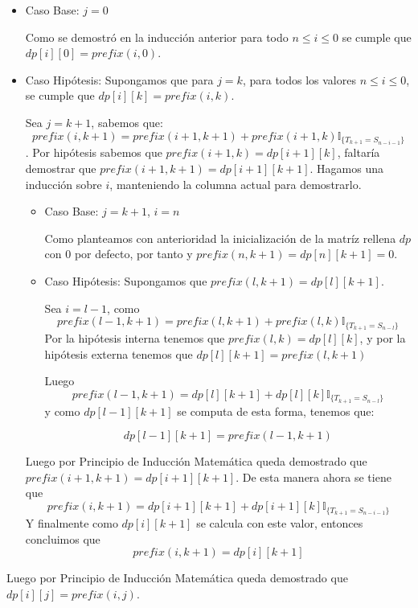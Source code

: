 \documentclass[a4paper]{article}
\begin{document}
\begin{itemize}
    \item Caso Base: $j = 0$ 
    
    Como se demostr\'o en la inducción anterior para todo $n \leq i \leq 0$ se cumple que $dp[i][0] = prefix(i,0)$. 

    \item Caso Hip\'otesis: Supongamos que para $j = k$, para todos los valores $n \leq i \leq 0$, se cumple que $dp[i][k] = prefix(i,k)$.
    
    Sea $j = k+1$, sabemos que: $$prefix(i,k+1) = prefix(i+1,k+1) + prefix(i+1,k)\mathbb{I}_{\{ T_{k+1} = S_{n-i-1}\}}$$. Por hip\'otesis 
    sabemos que $prefix(i+1,k) = dp[i+1][k]$, faltar\'ia demostrar que $prefix(i+1,k+1) = dp[i+1][k+1]$. Hagamos una inducci\'on sobre $i$, manteniendo la columna actual 
    para demostrarlo. 

    \begin{itemize}
        \item Caso Base: $j = k+1$, $i = n$
        
        Como planteamos con anterioridad la inicializaci\'on de la matr\'iz rellena $dp$ con $0$ por defecto, por tanto  
        y  $prefix(n,k+1)=dp[n][k+1] = 0$. 

        \item Caso Hip\'otesis: Supongamos que $prefix(l,k+1) = dp[l][k+1]$. 
        
        Sea $i = l-1$, como $$prefix(l-1,k+1) = prefix(l,k+1) + prefix(l,k)\mathbb{I}_{\{ T_{k+1} = S_{n-l}\}}$$
        Por la hip\'otesis interna tenemos que $prefix(l,k) = dp[l][k]$,
        y por la hip\'otesis externa tenemos que $dp[l][k+1] = prefix(l,k+1)$

        Luego $$prefix(l-1,k+1) = dp[l][k+1] + dp[l][k]\mathbb{I}_{\{ T_{k+1} = S_{n-l}\}}$$
        y como $dp[l-1][k+1]$ se computa de esta forma, tenemos que:

        $$dp[l-1][k+1] = prefix(l-1,k+1)$$
    \end{itemize}

    Luego por Principio de Inducción Matemática queda demostrado que $prefix(i+1,k+1) = dp[i+1][k+1]$.
    De esta manera ahora se tiene que
    $$prefix(i,k+1) = dp[i+1][k+1] + dp[i+1][k]\mathbb{I}_{\{ T_{k+1} = S_{n-i-1}\}}$$
    Y finalmente como $dp[i][k+1]$ se calcula con este valor, entonces concluimos que
    $$prefix(i,k+1) = dp[i][k+1]$$
\end{itemize}
    Luego por Principio de Inducción Matem\'atica queda demostrado que $dp[i][j] = prefix(i,j)$.
    
\end{document}
